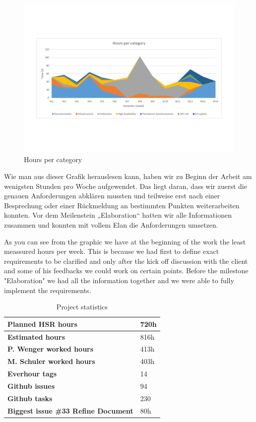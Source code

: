 \begin{figure}[]
	\includegraphics[trim=2cm 5cm 2cm 5.9cm, clip=true, width=\textwidth]{img/project_monitoring_weekly_hours_per_category.pdf}
	\caption{Hours per category}
	\label{fig:hours:per:category}
\end{figure}

Wie man aus dieser Grafik herauslesen kann, haben wir zu Beginn der Arbeit 
am wenigsten Stunden pro Woche aufgewendet. Das liegt daran, dass wir zuerst die 
genauen Anforderungen abklären mussten und teilweise erst nach einer Besprechung 
oder einer Rückmeldung an bestimmten Punkten weiterarbeiten konnten. 
Vor dem Meilenstein „Elaboration“ hatten wir alle Informationen zusammen und 
konnten mit vollem Elan die Anforderungen umsetzen.

As you can see from the graphic we have at the beginning of the work
the least meassured hours per week. This is because we had first to define exact requirements to be clarified and only after the kick off discussion
with the client and some of his feedbacks we could work on certain points.
Before the milestone "Elaboration" we had all the information together and
we were able to fully implement the requirements.


\begin{table}[H]
  \centering
  \begin{tabular}{|p{100mm}|p{35mm}|}
    \hline 	\bf Planned HSR hours & 720h \\ \hline
	\bf Estimated hours & 816h \\ \hline
	\bf P. Wenger worked hours & 413h \\ \hline
	\bf M. Schuler worked hours & 403h \\ \hline
	\bf Everhour tags & 14 \\ \hline
	\bf Github issues & 94 \\ \hline
	\bf Github tasks & 230 \\ \hline
	\bf Biggest issue \#33 Refine Document & 80h \\ \hline
  \end{tabular} \\
  \caption{Project statistics}
  \label{tab:projectstats}
\end{table}


